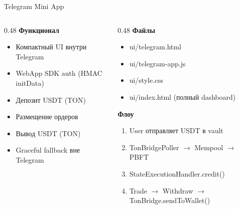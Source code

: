 \documentclass[aspectratio=169]{beamer}
\begin{document}
\begin{frame}{Telegram Mini App}

\begin{columns}[t]
\begin{column}{0.48\textwidth}
\textbf{Функционал}
\begin{itemize}
    \item Компактный UI внутри Telegram
    \item WebApp SDK auth (HMAC initData)
    \item Депозит USDT (TON)
    \item Размещение ордеров
    \item Вывод USDT (TON)
    \item Graceful fallback вне Telegram
\end{itemize}
\end{column}
\begin{column}{0.48\textwidth}
\textbf{Файлы}
\begin{itemize}
    \item ui/telegram.html
    \item ui/telegram-app.js
    \item ui/style.css
    \item ui/index.html (полный dashboard)
\end{itemize}
\textbf{Флоу}
\begin{enumerate}
    \item User отправляет USDT в vault
    \item TonBridgePoller $\to$ Mempool $\to$ PBFT
    \item StateExecutionHandler.credit()
    \item Trade $\to$ Withdraw $\to$ TonBridge.sendToWallet()
\end{enumerate}
\end{column}
\end{columns}
\end{frame}
\end{document}
